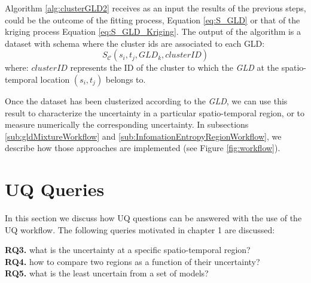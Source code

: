 Algorithm \ref{alg:clusterGLD2} receives as an input the results of the previous steps, could be the outcome of the fitting process, Equation \ref{eq:S_GLD} or that of the kriging process Equation \ref{eq:S_GLD_Kriging}. The output of the algorithm is a dataset with schema where the cluster ids are associated to each GLD:
\begin{equation}
S_{\mathcal{C}}(s_{i},t_{j},GLD_{k},clusterID)
\end{equation}
where:
$clusterID$ represents the ID of the cluster to which the \textit{GLD} at the spatio-temporal location $(s_{i},t_{j})$ belongs to.

Once the dataset has been clusterized according to the \textit{GLD}, we can use this result to characterize the uncertainty in a particular spatio-temporal region, or to measure numerically the corresponding uncertainty. In subsections \ref{sub:gldMixtureWorkflow} and \ref{sub:InfomationEntropyRegionWorkflow}, we describe how those approaches are implemented (see Figure \ref{fig:workflow}).

\section{UQ Queries}\label{sec:queries}
In this section we discuss how UQ questions can be answered with the use of the UQ workflow. The following queries motivated in chapter 1 are discussed:

\begin{tcolorbox}
\textbf{RQ3.} what is the uncertainty at a specific spatio-temporal region? \\
\textbf{RQ4.} how to compare two regions as a function of their uncertainty? \\
\textbf{RQ5.} what is the least uncertain from a set of models?
\end{tcolorbox}

